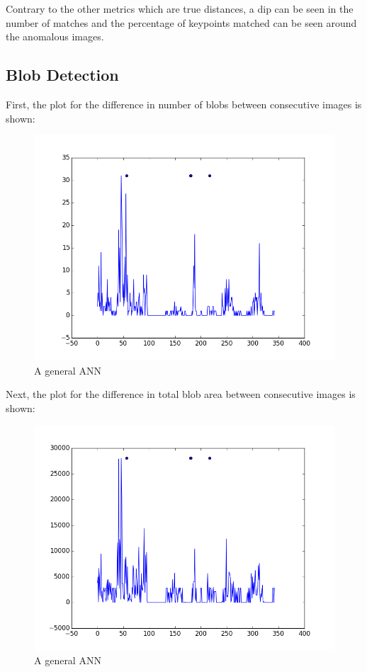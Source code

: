 Contrary to the other metrics which are true distances, a dip can be seen in the number of matches and the percentage of keypoints matched can be seen around the anomalous images.

\subsection{Blob Detection}

First, the plot for the difference in number of blobs between consecutive images is shown:

\begin{figure}[h]
\centering
\includegraphics[scale=.50]{figures/blobdiffstest}
\caption{A general ANN}
\label{fig:tamu-fig3}
\end{figure}

Next, the plot for the difference in total blob area between consecutive images is shown:

\begin{figure}[h]
\centering
\includegraphics[scale=.50]{figures/blobareadiffstest}
\caption{A general ANN}
\label{fig:tamu-fig3}
\end{figure}

